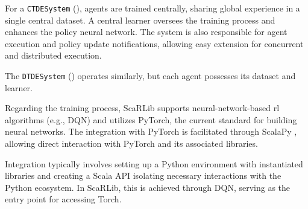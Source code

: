 \documentclass[12pt,a4paper,openright,twoside]{book}
\newcommand{\scarlib}{ScaRLib}
\begin{document}
For a \texttt{CTDESystem} (), agents are trained centrally, sharing global experience in a single central dataset. A central learner oversees the training process and enhances the policy neural network. The system is also responsible for agent execution and policy update notifications, allowing easy extension for concurrent and distributed execution.

The \texttt{DTDESystem} () operates similarly, but each agent possesses its dataset and learner.

Regarding the training process, \scarlib{} supports neural-network-based \ac{rl} algorithms (e.g., DQN) and utilizes PyTorch, the current standard for building neural networks. The integration with PyTorch is facilitated through ScalaPy \cite{Laddad2020}, allowing direct interaction with PyTorch and its associated libraries.

Integration typically involves setting up a Python environment with instantiated libraries and creating a Scala API isolating necessary interactions with the Python ecosystem. In \scarlib{}, this is achieved through DQN, serving as the entry point for accessing Torch.
\end{document}
